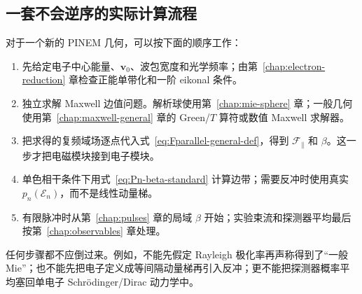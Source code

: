\subsection{一套不会逆序的实际计算流程}
对于一个新的 PINEM 几何，可以按下面的顺序工作：
\begin{enumerate}
\item 先给定电子中心能量、$\bm v_0$、波包宽度和光学频率；由第~\ref{chap:electron-reduction} 章检查正能单带化和一阶 eikonal 条件。
\item 独立求解 Maxwell 边值问题。解析球使用第~\ref{chap:mie-sphere} 章；一般几何使用第~\ref{chap:maxwell-general} 章的 Green/$T$ 算符或数值 Maxwell 求解器。
\item 把求得的复频域场逐点代入式~\eqref{eq:Fparallel-general-def}，得到 $\mathcal F_{\parallel}$ 和 $\beta$。这一步才把电磁模块接到电子模块。
\item 单色相干条件下用式~\eqref{eq:Pn-beta-standard} 计算边带；需要反冲时使用真实 $p_n(\mathcal E_n)$，而不是线性动量梯。
\item 有限脉冲时从第~\ref{chap:pulses} 章的局域 $\beta$ 开始；实验束流和探测器平均最后按第~\ref{chap:observables} 章处理。
\end{enumerate}
任何步骤都不应倒过来。例如，不能先假定 Rayleigh 极化率再声称得到了“一般 Mie”；也不能先把电子定义成等间隔动量梯再引入反冲；更不能把探测器概率平均塞回单电子 Schrödinger/Dirac 动力学中。

